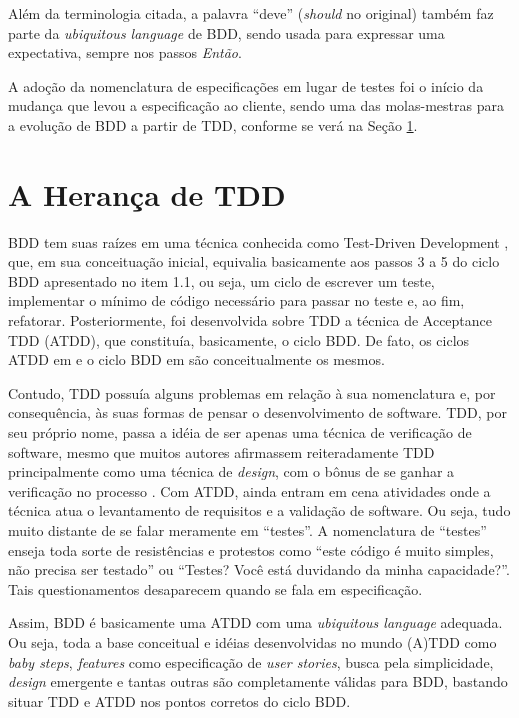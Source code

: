 \documentclass[a4paper,abntfigtabnum,noindentfirst]{abnt}
\begin{document}
Além da terminologia citada, a palavra ``deve'' (\textit{should} no original) também faz parte da \textit{ubiquitous language} de BDD, sendo usada para expressar uma expectativa, sempre nos passos \textit{Então}.

A adoção da nomenclatura de especificações em lugar de testes foi o início da mudança que levou a especificação ao cliente, sendo uma das molas-mestras para a evolução de BDD a partir de TDD, conforme se verá na Seção \ref{HerancaTDD}.

\section{A Herança de TDD}
\label{HerancaTDD}

BDD tem suas raízes em uma técnica conhecida como Test-Driven Development \cite{TDDByExample}, que, em sua conceituação inicial, equivalia basicamente aos passos 3 a 5 do ciclo BDD apresentado no item 1.1, ou seja, um ciclo de escrever um teste, implementar o mínimo de código necessário para passar no teste e, ao fim, refatorar. Posteriormente, foi desenvolvida sobre TDD a técnica de Acceptance TDD (ATDD), que constituía, basicamente, o ciclo BDD. De fato, os ciclos ATDD em  e o ciclo BDD em  são conceitualmente os mesmos.

Contudo, TDD possuía alguns problemas em relação à sua nomenclatura e, por consequência, às suas formas de pensar o desenvolvimento de software. TDD, por seu próprio nome, passa a idéia de ser apenas uma técnica de verificação de software, mesmo que muitos autores afirmassem reiteradamente TDD principalmente como uma técnica de \textit{design}, com o bônus de se ganhar a verificação no processo \cite{DrivingSoftwareQualityCrispin} \cite{TDDAstels} \cite{TDDDesignJanzen}. Com ATDD, ainda entram em cena atividades onde a técnica atua o levantamento de requisitos e a validação de software. Ou seja, tudo muito distante de se falar meramente em ``testes''. A nomenclatura de ``testes'' enseja toda sorte de resistências e protestos como ``este código é muito simples, não precisa ser testado'' ou ``Testes? Você está duvidando da minha capacidade?''. Tais questionamentos desaparecem quando se fala em especificação.

Assim, BDD é basicamente uma ATDD com uma \textit{ubiquitous language} adequada. Ou seja, toda a base conceitual e idéias desenvolvidas no mundo (A)TDD como \textit{baby steps}, \textit{features} como especificação de \textit{user stories}, busca pela simplicidade, \textit{design} emergente e tantas outras são completamente válidas para BDD, bastando situar TDD e ATDD nos pontos corretos do ciclo BDD.
\end{document}
